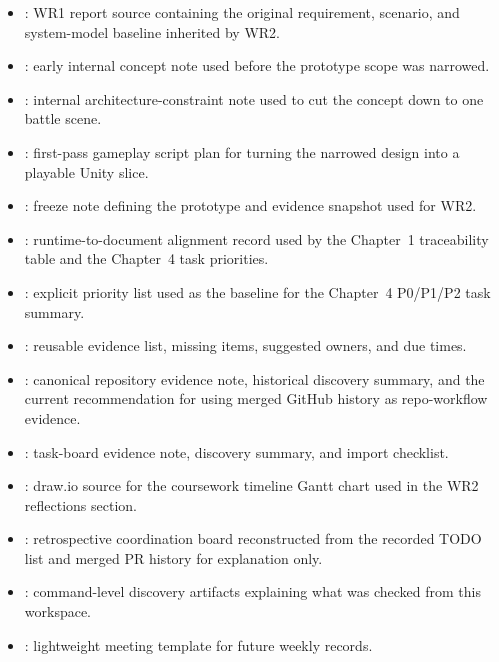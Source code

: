 \begingroup
\small
\sloppy
\begin{itemize}
\item {}: WR1 report source containing the original requirement, scenario, and system-model baseline inherited by WR2.
\item {}: early internal concept note used before the prototype scope was narrowed.
\item {}: internal architecture-constraint note used to cut the concept down to one battle scene.
\item {}: first-pass gameplay script plan for turning the narrowed design into a playable Unity slice.
\item {}: freeze note defining the prototype and evidence snapshot used for WR2.
\item {}: runtime-to-document alignment record used by the Chapter~1 traceability table and the Chapter~4 task priorities.
\item {}: explicit priority list used as the baseline for the Chapter~4 P0/P1/P2 task summary.
\item {}: reusable evidence list, missing items, suggested owners, and due times.
\item {}: canonical repository evidence note, historical discovery summary, and the current recommendation for using merged GitHub history as repo-workflow evidence.
\item {}: task-board evidence note, discovery summary, and import checklist.
\item {}: draw.io source for the coursework timeline Gantt chart used in the WR2 reflections section.
\item {}: retrospective coordination board reconstructed from the recorded TODO list and merged PR history for explanation only.
\item {}: command-level discovery artifacts explaining what was checked from this workspace.
\item {}: lightweight meeting template for future weekly records.

\end{itemize}
